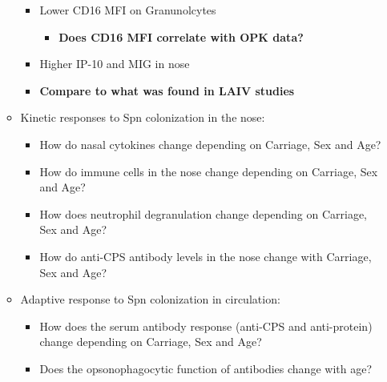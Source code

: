 \documentclass[
]{book}
\providecommand{\tightlist}{%
  \setlength{\itemsep}{0pt}\setlength{\parskip}{0pt}}
\begin{document}
\begin{itemize}
\begin{itemize}
    \begin{itemize}
    \item
      Lower CD16 MFI on Granunolcytes

      \begin{itemize}
      \tightlist
      \item
        \textbf{Does CD16 MFI correlate with OPK data?}
      \end{itemize}
    \item
      Higher IP-10 and MIG in nose
    \item
      \textbf{Compare to what was found in LAIV studies}
    \end{itemize}
  \item
    Kinetic responses to Spn colonization in the nose:

    \begin{itemize}
    \item
      How do nasal cytokines change depending on Carriage, Sex and Age?
    \item
      How do immune cells in the nose change depending on Carriage, Sex and Age?
    \item
      How does neutrophil degranulation change depending on Carriage, Sex and Age?
    \item
      How do anti-CPS antibody levels in the nose change with Carriage, Sex and Age?
    \end{itemize}
  \item
    Adaptive response to Spn colonization in circulation:

    \begin{itemize}
    \item
      How does the serum antibody response (anti-CPS and anti-protein) change depending on Carriage, Sex and Age?
    \item
      Does the opsonophagocytic function of antibodies change with age?
    \end{itemize}
  \end{itemize}
\end{itemize}

  
\end{document}
